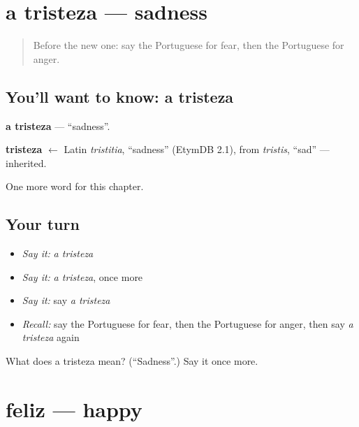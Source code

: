 \section[a tristeza]{a tristeza — sadness}

\label{lesson:PT-C36-tristeza}



\begin{quote}
Before the new one: say the Portuguese for fear, then the Portuguese for anger.
\end{quote}

\subsection*{You'll want to know: a tristeza}
\textbf{a tristeza} — \textquotedblleft{}sadness\textquotedblright{}.

\begin{cousinweb}
\textbf{tristeza} $\leftarrow$ Latin \emph{tristitia}, \textquotedblleft{}sadness\textquotedblright{} (EtymDB 2.1), from \emph{tristis}, \textquotedblleft{}sad\textquotedblright{} — inherited.
\end{cousinweb}

\begin{grammarlens}[title={What you've built}]
One more word for this chapter.
\end{grammarlens}

\subsection*{Your turn}
\begin{itemize}
\raggedright
  \item \emph{Say it:} \emph{a tristeza}
  \item \emph{Say it:} \emph{a tristeza}, once more
  \item \emph{Say it:} say \emph{a tristeza}
  \item \emph{Recall:} say the Portuguese for fear, then the Portuguese for anger, then say \emph{a tristeza} again
\end{itemize}

\begin{tcolorbox}[breakable,colback=teal!4,colframe=teal!35!black,title={Before you move on}]
What does a tristeza mean? (\textquotedblleft{}Sadness\textquotedblright{}.) Say it once more.
\end{tcolorbox}
\section[feliz]{feliz — happy}


